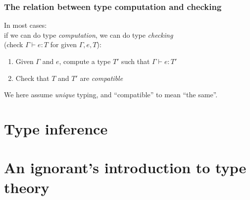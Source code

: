 \documentclass{beamer}
\begin{document}
\begin{frame}[fragile]\frametitle{The relation between type computation and checking}

  In most cases:\\
  if we can do type \emph{computation}, we can do type \emph{checking}\\
  (check $\Gamma \vdash e : T$ for given $\Gamma, e, T$):

  \begin{enumerate}
  \item  Given $\Gamma$ and $e$, compute a type $T'$ such that $\Gamma
    \vdash e : T'$
  \item Check that $T$ and $T'$ are \emph{compatible} 
  \end{enumerate}

  We here assume \emph{unique} typing, and ``compatible'' to mean ``the same''.

\end{frame}



\section{Type inference}



\section{An ignorant's introduction to type theory}






\end{document}
